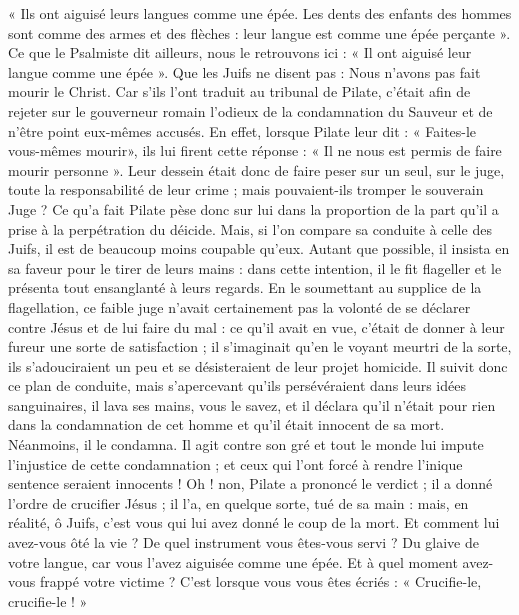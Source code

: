  « Ils ont aiguisé leurs langues comme une épée. Les dents des enfants des hommes sont comme des armes et des flèches : leur langue est comme une épée perçante ». Ce que le Psalmiste dit ailleurs, nous le retrouvons ici : « Il ont aiguisé leur langue comme une épée ». Que les Juifs ne disent pas : Nous n’avons pas fait mourir le Christ. Car s’ils l’ont traduit au tribunal de Pilate, c’était afin de rejeter sur le gouverneur romain l’odieux de la condamnation du Sauveur et de n’être point eux-mêmes accusés. En effet, lorsque Pilate leur dit : « Faites-le vous-mêmes mourir», ils lui firent cette réponse : « Il ne nous est permis de faire mourir personne ». Leur dessein était donc de faire peser sur un seul, sur le juge, toute la responsabilité de leur crime ; mais pouvaient-ils tromper le souverain Juge ? Ce qu’a fait Pilate pèse donc sur lui dans la proportion de la part qu’il a prise à la perpétration du déicide. Mais, si l’on compare sa conduite à celle des Juifs, il est de beaucoup moins coupable qu’eux. Autant que possible, il insista en sa faveur pour le tirer de leurs mains : dans cette intention, il le fit flageller et le présenta tout ensanglanté à leurs regards. En le soumettant au supplice de la flagellation, ce faible juge n’avait certainement pas la volonté de se déclarer contre Jésus et de lui faire du mal : ce qu’il avait en vue, c’était de donner à leur fureur une sorte de satisfaction ; il s’imaginait qu’en le voyant meurtri de la sorte, ils s’adouciraient un peu et se désisteraient de leur projet homicide. Il suivit donc ce plan de conduite, mais s’apercevant qu’ils persévéraient dans leurs idées sanguinaires, il lava ses mains, vous le savez, et il déclara qu’il n’était pour rien dans la condamnation de cet homme et qu’il était innocent de sa mort. Néanmoins, il le condamna. Il agit contre son gré et tout le monde lui impute l’injustice de cette condamnation ; et ceux qui l’ont forcé à rendre l’inique sentence seraient innocents ! Oh ! non, Pilate a prononcé le verdict ; il a donné l’ordre de crucifier Jésus ; il l’a, en quelque sorte, tué de sa main : mais, en réalité, ô Juifs, c’est vous qui lui avez donné le coup de la mort. Et comment lui avez-vous ôté la vie ? De quel instrument vous êtes-vous servi ? Du glaive de votre langue, car vous l’avez aiguisée comme une épée. Et à quel moment avez-vous frappé votre victime ? C’est lorsque vous vous êtes écriés : « Crucifie-le, crucifie-le ! »